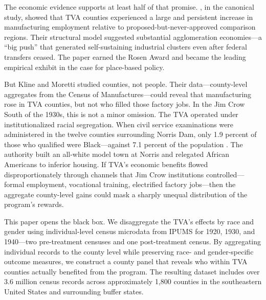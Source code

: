 \documentclass[12pt]{article}
\begin{document}
The economic evidence supports at least half of that promise. \citet{kline2014}, in the canonical study, showed that TVA counties experienced a large and persistent increase in manufacturing employment relative to proposed-but-never-approved comparison regions. Their structural model suggested substantial agglomeration economies---a ``big push'' that generated self-sustaining industrial clusters even after federal transfers ceased. The paper earned the Rosen Award and became the leading empirical exhibit in the case for place-based policy.

But Kline and Moretti studied counties, not people. Their data---county-level aggregates from the Census of Manufactures---could reveal that manufacturing rose in TVA counties, but not who filled those factory jobs. In the Jim Crow South of the 1930s, this is not a minor omission. The TVA operated under institutionalized racial segregation. When civil service examinations were administered in the twelve counties surrounding Norris Dam, only 1.9 percent of those who qualified were Black---against 7.1 percent of the population \citep{grant1990}. The authority built an all-white model town at Norris and relegated African Americans to inferior housing. If TVA's economic benefits flowed disproportionately through channels that Jim Crow institutions controlled---formal employment, vocational training, electrified factory jobs---then the aggregate county-level gains could mask a sharply unequal distribution of the program's rewards.

This paper opens the black box. We disaggregate the TVA's effects by race and gender using individual-level census microdata from IPUMS \citep{ruggles2024} for 1920, 1930, and 1940---two pre-treatment censuses and one post-treatment census. By aggregating individual records to the county level while preserving race- and gender-specific outcome measures, we construct a county panel that reveals who within TVA counties actually benefited from the program. The resulting dataset includes over 3.6 million census records across approximately 1,800 counties in the southeastern United States and surrounding buffer states.
\end{document}
